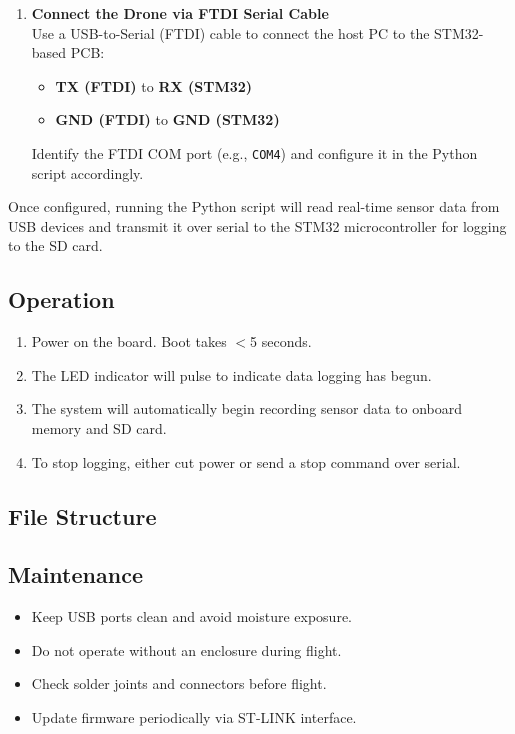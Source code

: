 \documentclass[../main.tex]{subfiles}
\begin{document}
\begin{enumerate}
    \item \textbf{Connect the Drone via FTDI Serial Cable} \\
    Use a USB-to-Serial (FTDI) cable to connect the host PC to the STM32-based PCB:
    \begin{itemize}
        \item \textbf{TX (FTDI)} to \textbf{RX (STM32)}
        \item \textbf{GND (FTDI)} to \textbf{GND (STM32)}
    \end{itemize}
    Identify the FTDI COM port (e.g., \texttt{COM4}) and configure it in the Python script accordingly.
\end{enumerate}

Once configured, running the Python script will read real-time sensor data from USB devices and transmit it over serial to the STM32 microcontroller for logging to the SD card.


\subsection{Operation}
\begin{enumerate}
    \item Power on the board. Boot takes $<$5 seconds.
    \item The LED indicator will pulse to indicate data logging has begun.
    \item The system will automatically begin recording sensor data to onboard memory and SD card.
    \item To stop logging, either cut power or send a stop command over serial.
\end{enumerate}

\subsection{File Structure}

\subsection{Maintenance}
\begin{itemize}
    \item Keep USB ports clean and avoid moisture exposure.
    \item Do not operate without an enclosure during flight.
    \item Check solder joints and connectors before flight.
    \item Update firmware periodically via ST-LINK interface.
\end{itemize}
\end{document}
